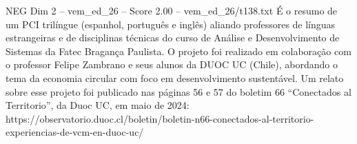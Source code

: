 \begin{textsample}{NEG Dim 2 – vem\_ed\_26 – Score 2.00 – vem\_ed\_26/t138.txt}
É o resumo de um PCI trilíngue (espanhol, português e inglês) aliando professores de línguas estrangeiras e de disciplinas técnicas do curso de Análise e Desenvolvimento de Sistemas da Fatec Bragança Paulista.
O projeto foi realizado em colaboração com o professor Felipe Zambrano e seus alunos da DUOC UC (Chile), abordando o tema da economia circular com foco em desenvolvimento sustentável.
Um relato sobre esse projeto foi publicado nas páginas 56 e 57 do boletim 66 “Conectados al Territorio”, da Duoc UC, em maio de 2024: https://observatorio.duoc.cl/boletin/boletin-n66-conectados-al-territorio-experiencias-de-vcm-en-duoc-uc/

\end{textsample}
